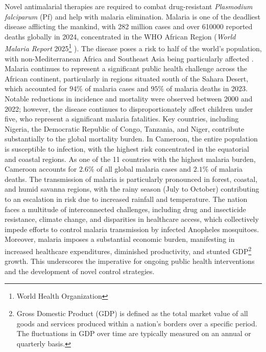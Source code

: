 Novel antimalarial therapies are required to combat drug-resistant \emph{Plasmodium falciparum} (Pf) and help with malaria elimination. Malaria is one of the deadliest disease afflicting the mankind, with \num{282} million cases and over \num{610000} reported deaths globally in 2024, concentrated in the WHO African Region (\emph{World Malaria Report} 2025\footnote{World Health Organization} \cite{who_malaria_2025}). The disease poses a risk to half of the world's population, with non-Mediterranean Africa and Southeast Asia being particularly affected \cite{Alghamdi2024}. Malaria continues to represent a significant public health challenge across the African continent, particularly in regions situated south of the Sahara Desert, which accounted for $94\%$ of malaria cases and $95\%$ of malaria deaths in 2023. Notable reductions in incidence and mortality were observed between 2000 and 2022; however, the disease continues to disproportionately affect children under five, who represent a significant malaria fatalities. Key countries, including Nigeria, the Democratic Republic of Congo, Tanzania, and Niger, contribute substantially to the global mortality burden. In Cameroon, the entire population is susceptible to infection, with the highest risk concentrated in the equatorial and coastal regions. As one of the 11 countries with the highest malaria burden, Cameroon accounts for $2.6\%$ of all global malaria cases and $2.1\%$ of malaria deaths. The transmission of malaria is particularly pronounced in forest, coastal, and humid savanna regions, with the rainy season (July to October) contributing to an escalation in risk due to increased rainfall and temperature. The nation faces a multitude of interconnected challenges, including drug and insecticide resistance, climate change, and disparities in healthcare access, which collectively impede efforts to control malaria transmission by infected Anopheles mosquitoes. Moreover, malaria imposes a substantial economic burden, manifesting in increased healthcare expenditures, diminished productivity, and stunted GDP\footnote{Gross Domestic Product (GDP) is defined as the total market value of all goods and services produced within a nation's borders over a specific period. The fluctuations in GDP over time are typically measured on an annual or quarterly basis.} growth. This underscores the imperative for ongoing public health interventions and the development of novel control strategies.

